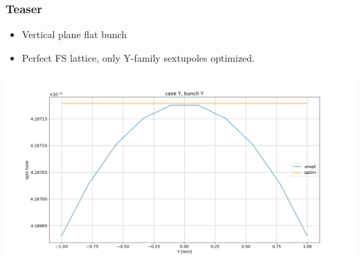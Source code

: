 \documentclass{beamer}
\begin{document}
\begin{frame}\frametitle{Teaser}
  \begin{itemize}
  \item Vertical plane flat bunch
  \item Perfect FS lattice, only Y-family sextupoles optimized.
  \end{itemize}
  \centering
  \includegraphics[width=\linewidth]{spin_tune_decoh_plot}
\end{frame}
\end{document}
